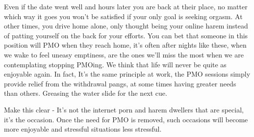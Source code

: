 \documentclass[easypeasy.tex]{subfiles}
\begin{document}
Even if the date went well and hours later you are back at their place, no matter which way it goes you won't be satisfied if your only goal is seeking orgasm. At other times, you drive home alone, only thought being your online harem instead of patting yourself on the back for your efforts. You can bet that someone in this position will PMO when they reach home, it's often after nights like these, when we wake to feel uneasy emptiness, are the ones we'll miss the most when we are contemplating stopping PMOing. We think that life will never be quite as enjoyable again. In fact, It's the same principle at work, the PMO sessions simply provide relief from the withdrawal pangs, at some times having greater needs than others. Greasing the water slide for the next cue.

Make this clear - It's not the internet porn and harem dwellers that are special, it's the occasion. Once the need for PMO is removed, such occasions will become more enjoyable and stressful situations less stressful.
\end{document}
